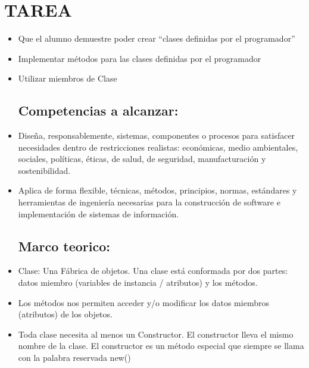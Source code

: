 \documentclass{article}
\begin{document}
    \section{TAREA}
	\begin{itemize}	
    \subsection{Objetivos:}
		\item Que el alumno demuestre poder crear  “clases definidas por el programador” 
		\item Implementar métodos para las clases definidas por el programador
        \item Utilizar miembros de Clase 
       
    \subsection{Competencias a alcanzar:}
		\item Diseña, responsablemente, sistemas, componentes o procesos para satisfacer necesidades dentro de restricciones realistas: económicas, medio ambientales, sociales, políticas, éticas, de salud, de seguridad, manufacturación y sostenibilidad.
        \item Aplica de forma flexible, técnicas, métodos, principios, normas, estándares y herramientas de ingeniería necesarias para la construcción de software e implementación de sistemas de información.
    \subsection{Marco teorico:}
        \item Clase: Una Fábrica de objetos. Una clase está conformada por dos partes: datos miembro (variables de instancia / atributos) y los métodos. 
        \item Los métodos nos permiten acceder y/o modificar los datos miembros (atributos) de los objetos. 
        \item Toda clase necesita al menos un Constructor. El constructor lleva el mismo nombre de la clase. El constructor es un método especial que siempre se llama con la palabra reservada new() 
        

\end{itemize}
\end{document}
